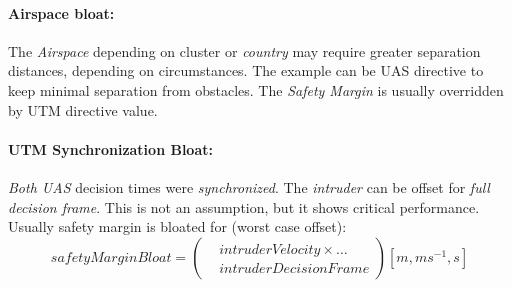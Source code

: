 \paragraph{Airspace bloat:} The \emph{Airspace} depending on cluster or \emph{country} may require greater separation distances, depending on circumstances. The example can be UAS directive to keep minimal separation from obstacles. The \emph{Safety Margin} is usually overridden by UTM directive value.

\paragraph{UTM Synchronization Bloat:} \emph{Both UAS} decision times were \emph{synchronized}. The \emph{intruder} can be offset for \emph{full decision frame}. This is not an assumption, but it shows critical performance. Usually safety margin is bloated for (worst case offset):
\begin{equation}\label{safetyMarginBloat}
    safetyMarginBloat = \left( \begin{aligned}
    &intruderVelocity \times\dots \\ &intruderDecisionFrame \end{aligned}\right)[m,ms^{-1},s]
\end{equation}